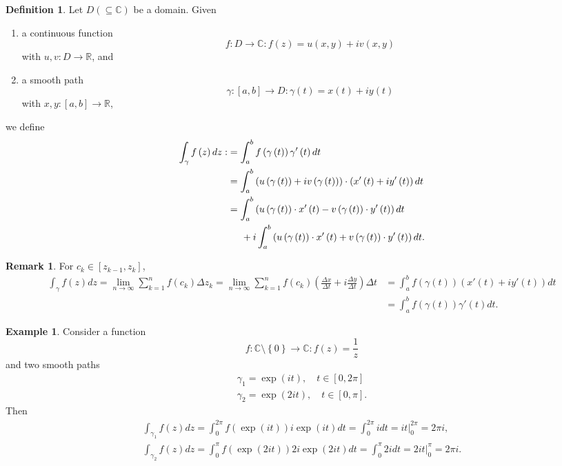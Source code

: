 \documentclass[12pt,openany]{book}
\theoremstyle{definition}
\newtheorem{definition}{Definition}[chapter]
\newtheorem{remark}{Remark}[section]
\newtheorem{example}{Example}[section]
\newcommand{\set}[1]{\left\{#1\right\}}
\newcommand{\R}{\mathbb{R}}
\newcommand{\C}{\mathbb{C}}
\newcommand{\of}[1]{\left( #1 \right)}
\begin{document}
	
	\begin{tcolorbox}[colback=white,colframe=defcolor,arc=5pt,title={\color{white}\bf Contour Integral}]
		\begin{definition}
			Let $D\of{\subseteq\C}$ be a domain. Given \begin{enumerate}
				\item a continuous function \[
				f:D\to\C:f\of{z}=u(x,y)+iv(x,y)
				\] with $u,v:D\to\R$, and
				\item a smooth path $$\gamma:[a,b]\to D:\gamma\of{t}=x\of{t}+iy\of{t}$$
				with $x,y:[a,b]\to\R$,
			\end{enumerate} 
			we define \begin{align*}
			\int_\gamma f\of{z}dz:&=\int_a^bf\of{\gamma\of{t}}\gamma'\of{t}dt\\
			&=\int_a^b\of{u\of{\gamma\of{t}}+iv\of{\gamma\of{t}}}\cdot\of{x'\of{t}+iy'\of{t}}dt\\
			&=\int_a^b\of{u\of{\gamma\of{t}}\cdot x'\of{t}-v\of{\gamma\of{t}}\cdot y'\of{t}}dt\\
			&\hspace{5mm} +i\int_a^b\of{u\of{\gamma\of{t}}\cdot x'\of{t}+v\of{\gamma\of{t}}\cdot y'\of{t}}dt.
			\end{align*}
		\end{definition}
	\end{tcolorbox}
	\begin{remark}
		For $c_k\in\left[z_{k-1},z_k\right]$,\begin{align*}
		\int_\gamma f\of{z}dz=\lim_{n\to\infty}\sum_{k=1}^nf\of{c_k}\Delta z_k=\lim_{n\to\infty}\sum_{k=1}^nf\of{c_k}\of{\frac{\Delta x}{\Delta t}+i\frac{\Delta y}{\Delta t}}\Delta t
		&=\int_a^bf\of{\gamma\of{t}}\of{x'\of{t}+iy'\of{t}}dt\\
		&=\int_a^bf\of{\gamma\of{t}}\gamma'\of{t}dt.
		\end{align*}
	\end{remark}
	\begin{example}
		Consider a function \[
		f:\C\setminus\set{0}\to\C:f\of{z}=\frac{1}{z}
		\] and two smooth paths
		\begin{align*}
		\gamma_1=\exp\of{it},\quad t\in\left[0,2\pi\right]\\
		\gamma_2=\exp\of{2it},\quad t\in\left[0,\pi\right].
		\end{align*} Then \begin{align*}
		\int_{\gamma_1}f\of{z}dz=\int_{0}^{2\pi}f\of{\exp\of{it}}i\exp\of{it}dt=\int_0^{2\pi}idt=it\bigg|_{0}^{2\pi}=2\pi i,\\
		\int_{\gamma_2}f\of{z}dz=\int_{0}^{\pi}f\of{\exp\of{2it}}2i\exp\of{2it}dt=\int_0^{\pi}2idt=2it\bigg|_{0}^{\pi}=2\pi i.
		\end{align*}
	\end{example}
	
\end{document}
